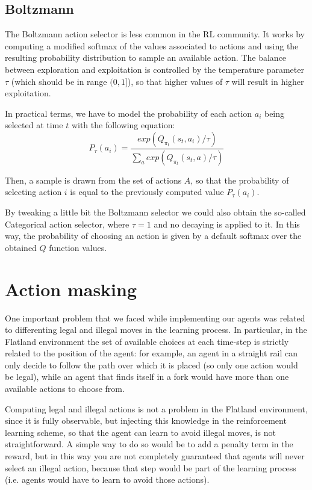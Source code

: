 \documentclass[a4paper,10pt]{report}
\begin{document}
\subsection{Boltzmann}\label{subsec:boltzmann}
The Boltzmann action selector is less common in the RL community. It works by computing a modified softmax of the values associated to actions and using the resulting probability distribution to sample an available action. The balance between exploration and exploitation is controlled by the temperature parameter $\tau$ (which should be in range $(0,1]$), so that higher values of $\tau$ will result in higher exploitation. 

In practical terms, we have to model the probability of each action $a_i$ being selected at time $t$ with the following equation:
$$
P_\tau(a_i) = \frac{exp(Q_{\pi_t}(s_t,a_i) / \tau)}{\sum_{a}exp(Q_{\pi_t}(s_t,a) / \tau)}
$$

Then, a sample is drawn from the set of actions $A$, so that the probability of selecting action $i$ is equal to the previously computed value $P_\tau(a_i)$.

By tweaking a little bit the Boltzmann selector we could also obtain the so-called Categorical action selector, where $\tau=1$ and no decaying is applied to it. In this way, the probability of choosing an action is given by a default softmax over the obtained $Q$ function values.

\section{Action masking}
One important problem that we faced while implementing our agents was related to differenting legal and illegal moves in the learning process. In particular, in the Flatland environment the set of available choices at each time-step is strictly related to the position of the agent: for example, an agent in a straight rail can only decide to follow the path over which it is placed (so only one action would be legal), while an agent that finds itself in a fork would have more than one available actions to choose from.

Computing legal and illegal actions is not a problem in the Flatland environment, since it is fully observable, but injecting this knowledge in the reinforcement learning scheme, so that the agent can learn to avoid illegal moves, is not straightforward. A simple way to do so would be to add a penalty term in the reward, but in this way you are not completely guaranteed that agents will never select an illegal action, because that step would be part of the learning process (i.e. agents would have to learn to avoid those actions).
\end{document}
